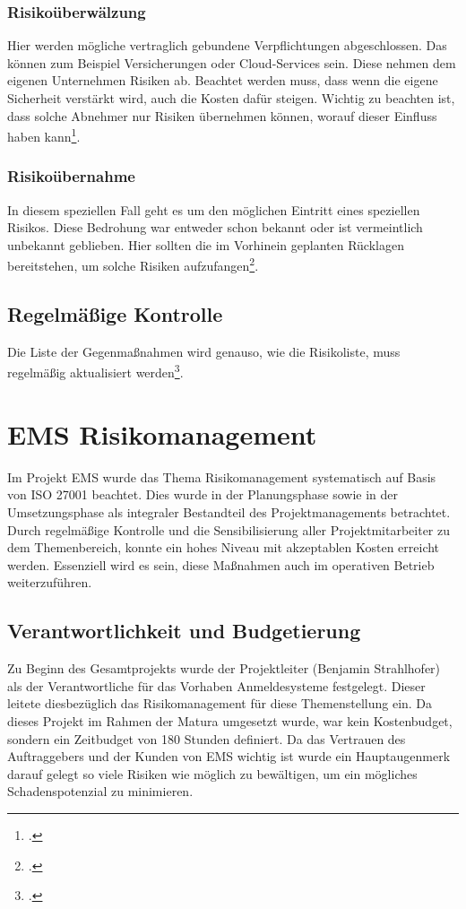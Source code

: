 \subsubsection{Risikoüberwälzung}
Hier werden mögliche vertraglich gebundene Verpflichtungen abgeschlossen. Das können zum Beispiel Versicherungen oder Cloud-Services sein. Diese nehmen dem eigenen Unternehmen Risiken ab. Beachtet werden muss, dass wenn die eigene Sicherheit verstärkt wird, auch die Kosten dafür steigen. Wichtig zu beachten ist, dass solche Abnehmer nur Risiken übernehmen können, worauf dieser Einfluss haben kann\footcite{risikomanagement-diplomarbeit}.

\subsubsection{Risikoübernahme}
In diesem speziellen Fall geht es um den möglichen Eintritt eines speziellen Risikos. Diese Bedrohung war entweder schon bekannt oder ist vermeintlich unbekannt geblieben. Hier sollten die im Vorhinein geplanten Rücklagen bereitstehen, um solche Risiken aufzufangen\footcite{risikomanagement-diplomarbeit}.

\subsection{Regelmäßige Kontrolle}
Die Liste der Gegenmaßnahmen wird genauso, wie die Risikoliste, muss regelmäßig aktualisiert werden\footcite{bva-risikomanagement}.  

\section{EMS Risikomanagement}
Im Projekt EMS wurde das Thema Risikomanagement systematisch auf Basis von ISO 27001 beachtet. Dies wurde in der Planungsphase sowie in der Umsetzungsphase als integraler Bestandteil des Projektmanagements betrachtet. Durch regelmäßige Kontrolle und die Sensibilisierung aller Projektmitarbeiter zu dem Themenbereich, konnte ein hohes Niveau mit akzeptablen Kosten erreicht werden. Essenziell wird es sein, diese Maßnahmen auch im operativen Betrieb weiterzuführen.

\subsection{Verantwortlichkeit und Budgetierung}
Zu Beginn des Gesamtprojekts wurde der Projektleiter (Benjamin Strahlhofer) als der Verantwortliche für das Vorhaben Anmeldesysteme festgelegt. Dieser leitete diesbezüglich das Risikomanagement für diese Themenstellung ein.
Da dieses Projekt im Rahmen der Matura umgesetzt wurde, war kein Kostenbudget, sondern ein Zeitbudget von 180 Stunden definiert. Da das Vertrauen des Auftraggebers und der Kunden von EMS wichtig ist wurde ein Hauptaugenmerk darauf gelegt so viele Risiken wie möglich zu bewältigen, um ein mögliches Schadenspotenzial zu minimieren.

